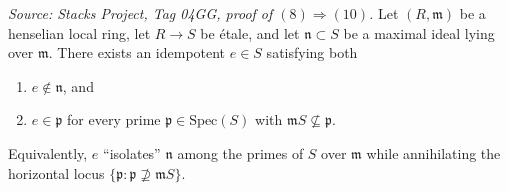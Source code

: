 \begin{lemma}
  \label{lem:etale-isolating-idempotent}
  \textit{Source: Stacks Project, Tag 04GG, proof of
  $(8) \Rightarrow (10)$.}
  Let $(R, \mathfrak{m})$ be a henselian local ring, let $R \to S$
  be étale, and let $\mathfrak{n} \subset S$ be a maximal ideal lying
  over $\mathfrak{m}$. There exists an idempotent $e \in S$
  satisfying both
  \begin{enumerate}
    \item $e \notin \mathfrak{n}$, and
    \item $e \in \mathfrak{p}$ for every prime $\mathfrak{p} \in
      \mathrm{Spec}(S)$ with $\mathfrak{m} S \not\subseteq
      \mathfrak{p}$.
  \end{enumerate}
  Equivalently, $e$ ``isolates'' $\mathfrak{n}$ among the primes of
  $S$ over $\mathfrak{m}$ while annihilating the horizontal locus
  $\{ \mathfrak{p} : \mathfrak{p} \not\supseteq \mathfrak{m} S \}$.
\end{lemma}

